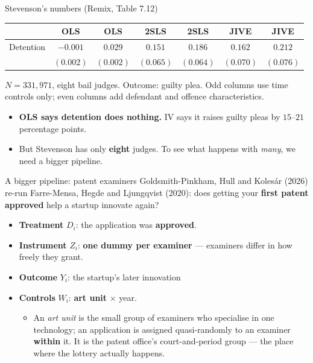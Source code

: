 \documentclass[
  11pt,
  ignorenonframetext,
  aspectratio=169,
]{beamer}
\providecommand{\tightlist}{%
  \setlength{\itemsep}{0pt}\setlength{\parskip}{0pt}}
\begin{document}
\begin{frame}{Stevenson's numbers (Remix, Table 7.12)}
\protect{}\label{stevensons-numbers-remix-table-7.12}
\begin{center}\small
\begin{tabular}{lcccccc}
\toprule
 & OLS & OLS & 2SLS & 2SLS & JIVE & JIVE \\
\midrule
Detention & $-0.001$ & $0.029$ & $0.151$ & $0.186$ & $0.162$ & $0.212$ \\
          & $(0.002)$ & $(0.002)$ & $(0.065)$ & $(0.064)$ & $(0.070)$ & $(0.076)$ \\
\bottomrule
\end{tabular}
\end{center}

\vspace{-0.2em}
\footnotesize

\(N = 331{,}971\), eight bail judges. Outcome: guilty plea. Odd columns
use time controls only; even columns add defendant and offence
characteristics. \normalsize

\begin{itemize}
\tightlist
\item
  \textbf{OLS says detention does nothing.} IV says it raises guilty
  pleas by \(15\)--\(21\) percentage points.
\item
  But Stevenson has only \textbf{eight} judges. To see what happens with
  \emph{many}, we need a bigger pipeline.
\end{itemize}
\end{frame}

\begin{frame}{A bigger pipeline: patent examiners}
\protect{}\label{a-bigger-pipeline-patent-examiners}
Goldsmith-Pinkham, Hull and Kolesár (2026) re-run Farre-Mensa, Hegde and
Ljungqvist (2020): does getting your \textbf{first patent approved} help
a startup innovate again?

\begin{itemize}
\tightlist
\item
  \textbf{Treatment} \(D_i\): the application was \textbf{approved}.
\item
  \textbf{Instrument} \(Z_i\): \textbf{one dummy per examiner} ---
  examiners differ in how freely they grant.
\item
  \textbf{Outcome} \(Y_i\): the startup's later innovation
\item
  \textbf{Controls} \(W_i\): \textbf{art unit} \(\times\) year.

  \begin{itemize}
  \tightlist
  \item
    An \emph{art unit} is the small group of examiners who specialise in
    one technology; an application is assigned quasi-randomly to an
    examiner \textbf{within} it. It is the patent office's
    court-and-period group --- the place where the lottery actually
    happens.
  \end{itemize}
\end{itemize}
\end{frame}
\end{document}
